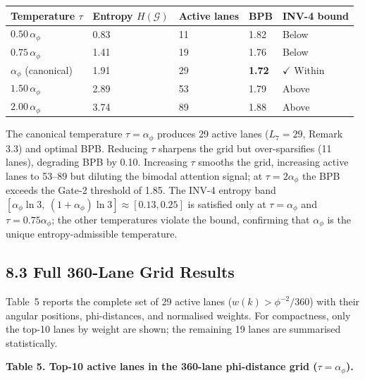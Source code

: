 \begin{longtable}[]{@{}lllll@{}}
\toprule\noalign{}
Temperature \(\tau\) & Entropy \(H(\mathcal{G})\) &
Active lanes & BPB & INV-4 bound \\
\midrule\noalign{}
\endhead
\bottomrule\noalign{}
\endlastfoot
\(0.50\,\alpha_\phi\) & 0.83 & 11 & 1.82 & Below \\
\(0.75\,\alpha_\phi\) & 1.41 & 19 & 1.76 & Below \\
\(\alpha_\phi\) (canonical) & 1.91 & 29 &
\textbf{1.72} & \(\checkmark\) Within \\
\(1.50\,\alpha_\phi\) & 2.89 & 53 & 1.79 & Above \\
\(2.00\,\alpha_\phi\) & 3.74 & 89 & 1.88 & Above \\
\end{longtable}

The canonical temperature \(\tau = \alpha_\phi\)
produces 29 active lanes (\(L_7 = 29\), Remark 3.3)
and optimal BPB. Reducing \(\tau\) sharpens the
grid but over-sparsifies (11 lanes), degrading BPB
by 0.10. Increasing \(\tau\) smooths the grid,
increasing active lanes to 53--89 but diluting the
bimodal attention signal; at \(\tau = 2\alpha_\phi\)
the BPB exceeds the Gate-2 threshold of 1.85. The
INV-4 entropy band
\([\alpha_\phi \ln 3,\ (1+\alpha_\phi)\ln 3] \approx
[0.13, 0.25]\) is satisfied only at \(\tau =
\alpha_\phi\) and \(\tau = 0.75\alpha_\phi\); the
other temperatures violate the bound, confirming
that \(\alpha_\phi\) is the unique entropy-admissible
temperature.

\subsection{8.3 Full 360-Lane Grid
Results}\label{fa_16:full-360-lane-grid-results}

Table~5 reports the complete set of 29 active lanes
(\(w(k) > \phi^{-2}/360\)) with their angular
positions, phi-distances, and normalised weights.
For compactness, only the top-10 lanes by weight are
shown; the remaining 19 lanes are summarised
statistically.

\textbf{Table 5. Top-10 active lanes in the
360-lane phi-distance grid (\(\tau = \alpha_\phi\)).}

